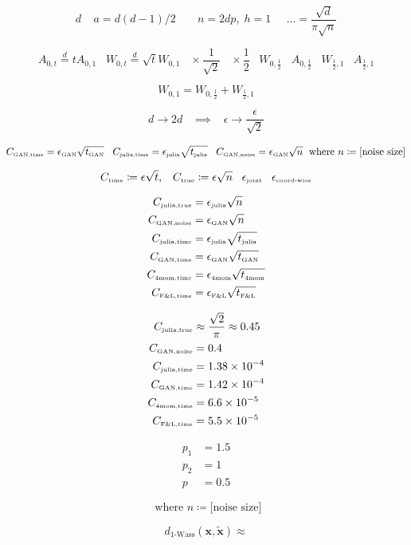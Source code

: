 \documentclass[a4paper,11pt]{article}
\renewcommand{\tilde}{\widetilde}
\begin{document}
\[
d \;\;\;\; a = d(d-1)/2  \;\;\;\;\;\;\; n=2dp, \; h = 1  \;\;\;\;\; \ldots = \frac{\sqrt{d}}{\pi \sqrt{n}}
\]

\[
A_{0,t} \overset{d}{=} t A_{0,1} \;\;\; W_{0,t} \overset{d}{=} \sqrt{t} W_{0,1} \;\;\; \times \frac{1}{\sqrt{2}} \;\;\; \times \frac{1}{2} \;\;\; W_{0,\frac{1}{2}} \;\;\; A_{0,\frac{1}{2}} \;\;\; W_{\frac{1}{2}, 1} \;\;\; A_{\frac{1}{2}, 1}
\]

\[
W_{0,1} = W_{0,\frac{1}{2}} + W_{\frac{1}{2}, 1}
\]

\[
d \rightarrow 2d \;\;\; \implies \;\;\; \epsilon \rightarrow \frac{\epsilon}{\sqrt{2}}
\]

\[
C_{\text{\tiny GAN,time}} = \epsilon_{\text{\tiny GAN}} \sqrt{t_{\text{\tiny GAN}}}  \;\;\; C_{\text{\tiny julia,time}} = \epsilon_{\text{\tiny julia}} \sqrt{t_{\text{\tiny julia}}}  \;\;\; C_{\text{\tiny GAN,noise}} = \epsilon_{\text{\tiny GAN}} \sqrt{n} \;\text{ where } n \coloneqq \text{[noise size]}
\]

\[
C_{\text{\tiny time}} \coloneqq \epsilon \sqrt{t}, \;\;\; C_{\text{\tiny true}} \coloneqq \epsilon \sqrt{n} \;\;\; \epsilon_{\text{\tiny joint}} \;\;\; \epsilon_{\text{\tiny coord-wise}}
\]

\begin{align}
    C_{\text{\tiny julia,true}} &= \epsilon_{\text{\tiny julia}} \sqrt{n} \\
    C_{\text{\tiny GAN,noise}} &= \epsilon_{\text{\tiny GAN}} \sqrt{n} \\
	C_{\text{\tiny julia,time}} &= \epsilon_{\text{\tiny julia}} \sqrt{t_{\text{\tiny julia}}} \\
    C_{\text{\tiny GAN,time}} &= \epsilon_{\text{\tiny GAN}} \sqrt{t_{\text{\tiny GAN}}} \\
    C_{\text{\tiny 4mom,time}} &= \epsilon_{\text{\tiny 4mom}} \sqrt{t_{\text{\tiny 4mom}}} \\
    C_{\text{\tiny F\&L,time}} &= \epsilon_{\text{\tiny F\&L}} \sqrt{t_{\text{\tiny F\&L}}} \\
\end{align}

\begin{align}
	C_{\text{\tiny julia,true}} &\approx \frac{\sqrt{2}}{\pi} \approx 0.45 \\
    C_{\text{\tiny GAN,noise}} &= 0.4 \\
	C_{\text{\tiny julia,time}} &= 1.38 \times 10^{-4} \\
    C_{\text{\tiny GAN,time}} &= 1.42 \times 10^{-4} \\
    C_{\text{\tiny 4mom,time}} &= 6.6 \times 10^{-5} \\
    C_{\text{\tiny F\&L,time}} &=  5.5 \times 10^{-5}
\end{align}

\begin{align}
	p_1 &= 1.5 \\
	p_2 &= 1 \\
	p &= 0.5
\end{align}

\[
\text{ where } n \coloneqq \text{[noise size]}
\]

\[
d_{\text{1-Wass}}({\boldsymbol x}, \tilde{{\boldsymbol x}}) \approx
\]
\end{document}
